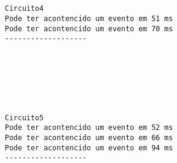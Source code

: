 \documentclass[11pt]{article}
\begin{document}
    \begin{center}
    \end{center}
    { \hspace*{\fill} \\}
    
    \begin{center}
    \end{center}
    { \hspace*{\fill} \\}
    
    \begin{Verbatim}[commandchars=\\\{\}]
Circuito4
Pode ter acontencido um evento em 51 ms
Pode ter acontencido um evento em 70 ms
-------------------
    \end{Verbatim}

    \begin{center}
    \end{center}
    { \hspace*{\fill} \\}
    
    \begin{center}
    \end{center}
    { \hspace*{\fill} \\}
    
    \begin{center}
    \end{center}
    { \hspace*{\fill} \\}
    
    \begin{Verbatim}[commandchars=\\\{\}]
Circuito5
Pode ter acontencido um evento em 52 ms
Pode ter acontencido um evento em 66 ms
Pode ter acontencido um evento em 94 ms
-------------------
    \end{Verbatim}


    
    
    
\end{document}
